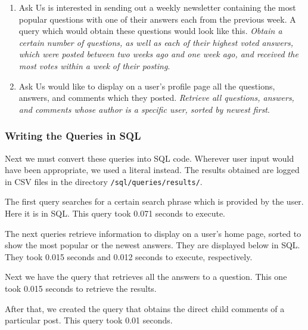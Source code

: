 \begin{enumerate}
	\item
	Ask Us is interested in sending out a weekly newsletter containing the most popular questions with one of their answers each from the previous week. A query which would obtain these questions would look like this. \emph{Obtain a certain number of questions, as well as each of their highest voted answers, which were posted between two weeks ago and one week ago, and received the most votes within a week of their posting}.

	\item
	Ask Us would like to display on a user's profile page all the questions, answers, and comments which they posted. \emph{Retrieve all questions, answers, and comments whose author is a specific user, sorted by newest first}.

\end{enumerate}

\subsubsection{Writing the Queries in SQL}

Next we must convert these queries into SQL code. Wherever user input would have been appropriate, we used a literal instead. The results obtained are logged in CSV files in the directory \verb`/sql/queries/results/`.

The first query searches for a certain search phrase which is provided by the user. Here it is in SQL. This query took 0.071 seconds to execute.


The next queries retrieve information to display on a user's home page, sorted to show the most popular or the newest answers. They are displayed below in SQL. They took 0.015 seconds and 0.012 seconds to execute, respectively.


Next we have the query that retrieves all the answers to a question. This one took 0.015 seconds to retrieve the results.


After that, we created the query that obtains the direct child comments of a particular post. This query took 0.01 seconds.

